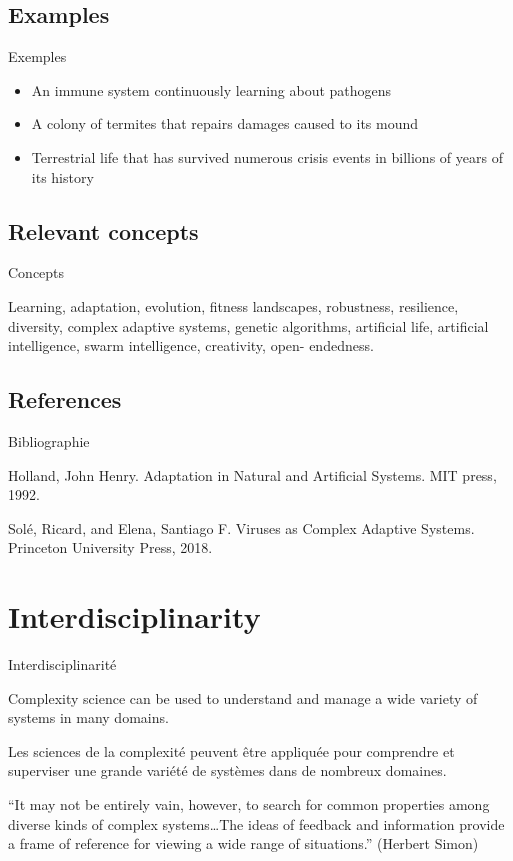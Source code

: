 \documentclass[12pt]{article}
\begin{document}
	
	
	
\subsection*{Examples}{Exemples}

\begin{itemize}
	\item An immune system continuously learning about pathogens
	\item A colony of termites that repairs damages caused to its mound
	\item Terrestrial life that has survived numerous crisis events in billions of years of its history
\end{itemize}

\subsection*{Relevant concepts}{Concepts}

Learning, adaptation, evolution, fitness landscapes, robustness, resilience, diversity, complex adaptive systems, genetic algorithms, artificial life, artificial intelligence, swarm intelligence, creativity, open- endedness.

\subsection*{References}{Bibliographie}

Holland, John Henry. Adaptation in Natural and Artificial Systems. MIT press, 1992.

Solé, Ricard, and Elena, Santiago F. Viruses as Complex Adaptive Systems. Princeton University Press, 2018.
	



\section{Interdisciplinarity}{Interdisciplinarité}

Complexity science can be used to understand and manage a wide variety of systems in many domains.

Les sciences de la complexité peuvent être appliquée pour comprendre et superviser une grande variété de systèmes dans de nombreux domaines.


``It may not be entirely vain, however, to search for common properties among diverse kinds of complex systems\ldots The ideas of feedback and information provide a frame of reference for viewing a wide range of situations.'' (Herbert Simon)
\end{document}
